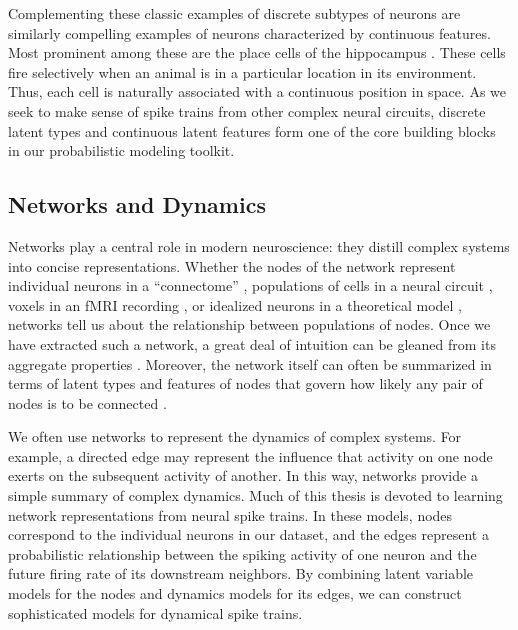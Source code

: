 Complementing these classic examples of discrete subtypes of neurons 
are similarly compelling examples of neurons characterized by 
continuous features. Most prominent among these are the place cells 
of the hippocampus \cite{OKeefe78}. These cells fire selectively 
when an animal is in a particular location in its environment. Thus,
each cell is naturally associated with a continuous position in 
space. As we seek to make sense of spike trains from other complex neural circuits, 
discrete latent types and continuous latent features form one of the
core building blocks in our probabilistic modeling toolkit. 


\subsection{Networks and Dynamics}
Networks play a central role in modern neuroscience: they distill
complex systems into concise representations. Whether the
nodes of the network represent individual neurons in a ``connectome''
\cite[e.g.]{sporns2005human}, populations of cells in a neural circuit
\cite[e.g.]{felleman1991distributed}, voxels in an fMRI recording
\cite[e.g.]{friston1994functional}, or idealized neurons in a
theoretical model \cite[e.g.]{hopfield1982neural}, networks tell us
about the relationship between populations of nodes.  Once we have 
extracted such a network, a great deal of intuition can be gleaned 
from its aggregate properties \cite{bullmore2009complex, newman2003structure}.
Moreover, the network itself can often be summarized in terms of 
latent types and features of nodes that govern how likely any 
pair of nodes is to be connected \cite{Goldenberg-2010}.

We often use networks to represent the dynamics of complex systems.
For example, a directed edge may represent the influence that activity
on one node exerts on the subsequent activity of another. In this way,
networks provide a simple summary of complex dynamics. Much of this 
thesis is devoted to learning network representations from neural 
spike trains. In these models, nodes correspond to the individual 
neurons in our dataset, and the edges represent a probabilistic 
relationship between the spiking activity of one neuron and the 
future firing rate of its downstream neighbors.  By combining 
latent variable models for the nodes and dynamics models for its edges, 
we can construct sophisticated models for dynamical spike trains.



